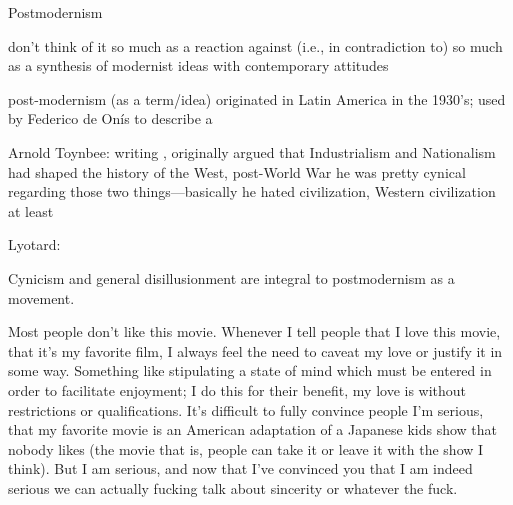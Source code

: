 \documentclass[../butidigress.tex]{subfiles}
\newcounter{worldwarcounter}\setcounter{worldwarcounter}{1}
\begin{document}
\setcounter{worldwarcounter}{2}
\begin{somenotes}{Postmodernism}
    \item don't think of it so much as a reaction against (i.e., in contradiction to) so much as a synthesis of modernist ideas with contemporary attitudes
    \item post-modernism (as a term/idea) originated in Latin America in the 1930's; used by Federico de Onís to describe a \autocite[4]{originspostmodernity}
    \item Arnold Toynbee: writing , originally argued that Industrialism and Nationalism had shaped the history of the West, post-World War  he was pretty cynical regarding those two things---basically he hated civilization, Western civilization at least
    \item Lyotard: \autocite{postmodernsep}
\end{somenotes}

Cynicism and general disillusionment are integral to postmodernism as a movement.




Most people don't like this movie.
Whenever I tell people that I love this movie, that it's my favorite film, I always feel the need to caveat my love or justify it in some way.
Something like stipulating a state of mind which must be entered in order to facilitate enjoyment; I do this for their benefit, my love is without restrictions or qualifications.
It's difficult to fully convince people I'm serious, that my favorite movie is an American adaptation of a Japanese kids show that nobody likes (the movie that is, people can take it or leave it with the show I think).
But I am serious, and now that I've convinced you that I am indeed serious we can actually fucking talk about sincerity or whatever the fuck.
\end{document}
